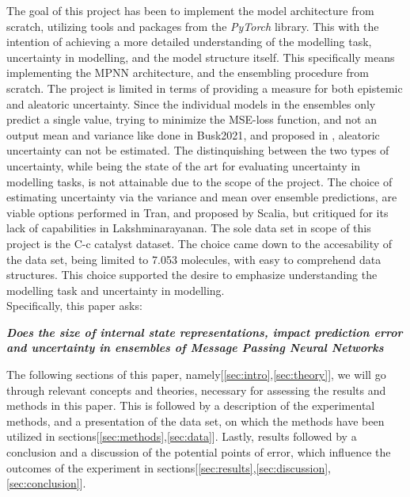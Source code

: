 The goal of this project has been to implement the model architecture from scratch, utilizing tools and packages from the
\textit{PyTorch} library. This with the intention of achieving a more detailed understanding of the modelling task, uncertainty in modelling,
and the model structure itself. This specifically means implementing the MPNN architecture\cite{PAINN}, and the ensembling procedure from
scratch. The project is limited in terms of providing a measure for both epistemic and aleatoric uncertainty. Since the individual models in the ensembles
only predict a single value, trying to minimize the MSE-loss function, and not an output mean and variance like done in Busk2021\cite{Busk2021}, and
proposed in \cite{Lakshminarayanan2016}, aleatoric uncertainty can not be estimated. The distinquishing between the two types of uncertainty,
while being the state of the art for evaluating uncertainty in modelling tasks, is not attainable due to the scope of the project.
The choice of estimating uncertainty via the variance and mean over ensemble predictions, are viable options performed in Tran\cite{Tran2019},
and proposed by Scalia\cite{Scalia2019}, but critiqued for its lack of capabilities in Lakshminarayanan\cite{Lakshminarayanan2016}.
The sole data set in scope of this project is the C-c catalyst dataset\cite{Meyer2018}. The choice came down to the accesability of the data set,
being limited to 7.053 molecules, with easy to comprehend data structures. This choice supported the desire to emphasize understanding the 
modelling task and uncertainty in modelling. \\

Specifically, this paper asks:

\begin{center}
  \textbf{\textit{Does the size of internal state representations, impact prediction error and uncertainty in ensembles of
      Message Passing Neural Networks}}
\end{center}


The following sections of this paper, namely[\ref{sec:intro},\ref{sec:theory}],
we will go through relevant concepts and theories, necessary for assessing the results and methods in this paper.
This is followed by a description of the experimental methods, and a presentation of the data set,
on which the methods have been utilized in sections[\ref{sec:methods},\ref{sec:data}].
Lastly, results followed by a conclusion and a discussion of the potential points of error,
which influence the outcomes of the experiment in sections[\ref{sec:results},\ref{sec:discussion},\ref{sec:conclusion}].

\newpage


